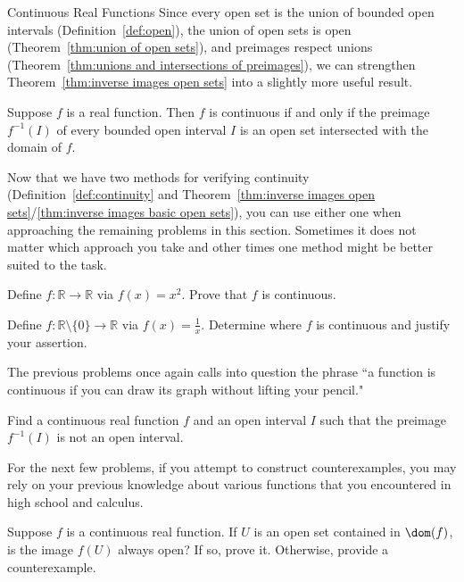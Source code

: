 \begin{section}{Continuous Real Functions}
Since every open set is the union of bounded open intervals (Definition~\ref{def:open}), the union of open sets is open (Theorem~\ref{thm:union of open sets}), and preimages respect unions (Theorem~\ref{thm:unions and intersections of preimages}), we can strengthen Theorem~\ref{thm:inverse images open sets} into a slightly more useful result.  

\begin{theorem}\label{thm:inverse images basic open sets}
Suppose $f$ is a real function. Then $f$ is continuous if and only if the preimage $f^{-1}(I)$ of every bounded open interval $I$ is an open set intersected with the domain of $f$.
\end{theorem}

Now that we have two methods for verifying continuity (Definition~\ref{def:continuity} and Theorem~\ref{thm:inverse images open sets}/\ref{thm:inverse images basic open sets}), you can use either one when approaching the remaining problems in this section. Sometimes it does not matter which approach you take and other times one method might be better suited to the task.

\begin{problem}
Define $f:\mathbb{R}\to\mathbb{R}$ via $f(x)=x^2$. Prove that $f$ is continuous.
\end{problem}

\begin{problem}
Define $f:\mathbb{R}\setminus\{0\}\to\mathbb{R}$ via $f(x)=\frac{1}{x}$. Determine where $f$ is continuous and justify your assertion.
\end{problem}

The previous problems once again calls into question the phrase ``a function is continuous if you can draw its graph without lifting your pencil."

\begin{problem}
Find a continuous real function $f$ and an open interval $I$ such that the preimage $f^{-1}(I)$ is not an open interval.
\end{problem}

For the next few problems, if you attempt to construct counterexamples, you may rely on your previous knowledge about various functions that you encountered in high school and calculus.

\begin{problem}
Suppose $f$ is a continuous real function. If $U$ is an open set contained in $\dom(f)$, is the image $f(U)$ always open?  If so, prove it.  Otherwise, provide a counterexample.
\end{problem}


\end{section}
